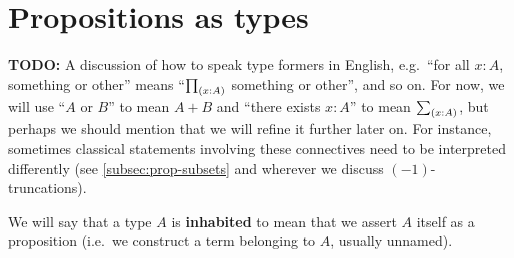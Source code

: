 


\section{Propositions as types}
\label{sec:pat}

\textbf{TODO:} A discussion of how to speak type formers in English, e.g.\ ``for all $x:A$, something or other'' means ``$\prd{x:A}$ something or other'', and so on.
For now, we will use ``$A$ or $B$'' to mean $A+B$ and ``there exists $x:A$'' to mean $\sm{x:A}$, but perhaps we should mention that we will refine it further later on.
For instance, sometimes classical statements involving these connectives need to be interpreted differently (see \autoref{subsec:prop-subsets} and wherever we discuss $(-1)$-truncations).

We will say that a type $A$ is \textbf{inhabited} to mean that we assert $A$ itself as a proposition (i.e.\ we construct a term belonging to $A$, usually unnamed).



